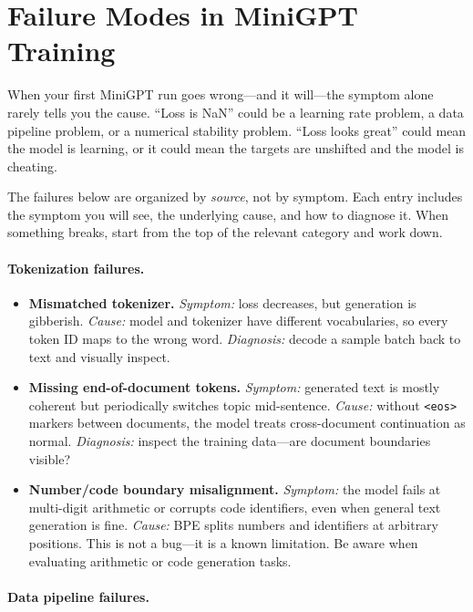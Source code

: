 \section{Failure Modes in MiniGPT Training}
\label{sec:training-failures}

When your first MiniGPT run goes wrong---and it will---the symptom alone rarely tells you the cause. ``Loss is NaN'' could be a learning rate problem, a data pipeline problem, or a numerical stability problem. ``Loss looks great'' could mean the model is learning, or it could mean the targets are unshifted and the model is cheating.

The failures below are organized by \emph{source}, not by symptom. Each entry includes the symptom you will see, the underlying cause, and how to diagnose it. When something breaks, start from the top of the relevant category and work down.

\paragraph{Tokenization failures.}

\begin{itemize}
  \item \textbf{Mismatched tokenizer.} \emph{Symptom:} loss decreases, but generation is gibberish.
  \emph{Cause:} model and tokenizer have different vocabularies, so every token ID maps to the wrong word.
  \emph{Diagnosis:} decode a sample batch back to text and visually inspect.
  \item \textbf{Missing end-of-document tokens.} \emph{Symptom:} generated text is mostly coherent but periodically switches topic mid-sentence.
  \emph{Cause:} without \texttt{<eos>} markers between documents, the model treats cross-document continuation as normal.
  \emph{Diagnosis:} inspect the training data---are document boundaries visible?
  \item \textbf{Number/code boundary misalignment.} \emph{Symptom:} the model fails at multi-digit arithmetic or corrupts code identifiers, even when general text generation is fine. \emph{Cause:} BPE splits numbers and identifiers at arbitrary positions. This is not a bug---it is a known limitation. Be aware when evaluating arithmetic or code generation tasks.
\end{itemize}

\paragraph{Data pipeline failures.}

